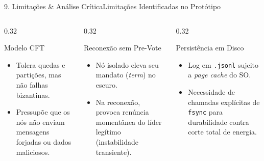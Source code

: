 \documentclass[aspectratio=169,10pt]{beamer}
\begin{document}
\begin{frame}{9. Limitações \& Análise Crítica}{Limitações Identificadas no Protótipo}
  \begin{columns}[t]
    \begin{column}{0.32\textwidth}
      \begin{alertblock}{Modelo CFT}
        \begin{itemize}
          \item Tolera quedas e partições, mas não falhas bizantinas.
          \item Pressupõe que os nós não enviam mensagens forjadas ou dados maliciosos.
        \end{itemize}
      \end{alertblock}
    \end{column}
    \begin{column}{0.32\textwidth}
      \begin{alertblock}{Reconexão sem Pre-Vote}
        \begin{itemize}
          \item Nó isolado eleva seu mandato (\textit{term}) no escuro.
          \item Na reconexão, provoca renúncia momentânea do líder legítimo (instabilidade transiente).
        \end{itemize}
      \end{alertblock}
    \end{column}
    \begin{column}{0.32\textwidth}
      \begin{block}{Persistência em Disco}
        \begin{itemize}
          \item Log em \texttt{.jsonl} sujeito a \textit{page cache} do SO.
          \item Necessidade de chamadas explícitas de \texttt{fsync} para durabilidade contra corte total de energia.
        \end{itemize}
      \end{block}
    \end{column}
  \end{columns}
\end{frame}
\end{document}
